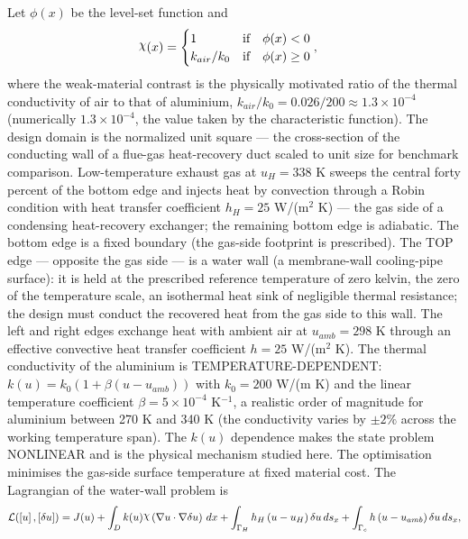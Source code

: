 \documentclass[preview]{standalone}
\let\oldcdot\cdot
\let\cdot\oldcdot
\begin{document}
Let $\phi(x)$ be the level-set function and
 \begin{align*}\raisebox{\depth}{$\chi$}(x) &= \begin{cases} 1 & \mbox{if}\quad \phi(x) < 0 \\ k_{air}/k_0 & \mbox{if}\quad \phi(x)  \ge 0 \end{cases},\end{align*}
where the weak-material contrast is the physically motivated ratio of the thermal conductivity of air to that of aluminium, $k_{air}/k_0 = 0.026/200 \approx 1.3 \times 10^{-4}$ (numerically $1.3 \times 10^{-4}$, the value taken by the characteristic function).
The design domain is the normalized unit square — the cross-section of the conducting wall of a flue-gas heat-recovery duct scaled to unit size for benchmark comparison.  Low-temperature exhaust gas at $u_H = 338$ K sweeps the central forty percent of the bottom edge and injects heat by convection through a Robin condition with heat transfer coefficient $h_H = 25$ W/(m$^{2}$ K) — the gas side of a condensing heat-recovery exchanger; the remaining bottom edge is adiabatic.  The bottom edge is a fixed boundary (the gas-side footprint is prescribed).  The TOP edge — opposite the gas side — is a water wall (a membrane-wall cooling-pipe surface): it is held at the prescribed reference temperature of zero kelvin, the zero of the temperature scale, an isothermal heat sink of negligible thermal resistance; the design must conduct the recovered heat from the gas side to this wall.  The left and right edges exchange heat with ambient air at $u_{amb} = 298$ K through an effective convective heat transfer coefficient $h = 25$ W/(m$^{2}$ K).  The thermal conductivity of the aluminium is TEMPERATURE-DEPENDENT: $k(u) = k_0 \left( 1 + \beta \left( u - u_{amb}\right)\right)$ with $k_0 = 200$ W/(m K) and the linear temperature coefficient $\beta = 5 \times 10^{-4}$ K$^{-1}$, a realistic order of magnitude for aluminium between 270 K and 340 K (the conductivity varies by $\pm 2\%$ across the working temperature span).  The $k(u)$ dependence makes the state problem NONLINEAR and is the physical mechanism studied here.  The optimisation minimises the gas-side surface temperature at fixed material cost.
The Lagrangian of the water-wall problem is
\begin{dmath*}
\mathcal L(\left[ u\right],\left[ \delta u\right]) = J(u) +  \int_{D} k(u) \raisebox{\depth}{$\chi$} \left(  \nabla u  \cdot  \nabla \delta u  \right) \,dx + \int_{\Gamma_H} h_H \left( u - u_{H}\right) \delta u \,ds_x + \int_{\Gamma_c} h \left( u - u_{amb}\right) \delta u \,ds_x ,
\end{dmath*}
\end{document}
